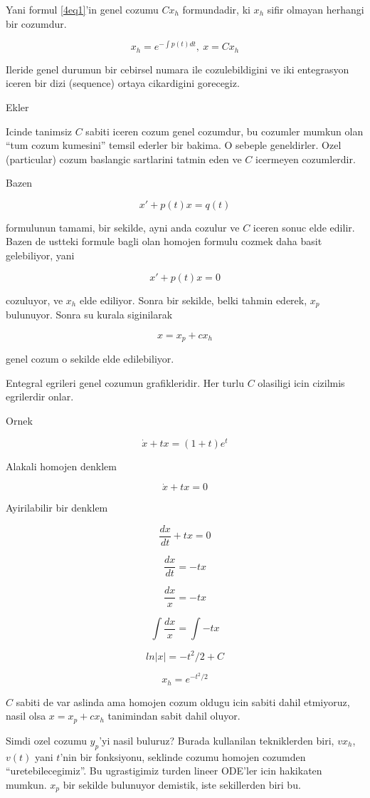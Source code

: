 \documentclass[12pt,fleqn]{article}
\begin{document}
Yani formul \ref{4eq1}'in genel cozumu $C x_h$ formundadir, ki $x_h$ sifir
olmayan herhangi bir cozumdur.

\[ x_h = e^{- \int p(t) dt} , \ x = C x_h \]

Ileride genel durumun bir cebirsel numara ile cozulebildigini ve iki
entegrasyon iceren bir dizi (sequence) ortaya cikardigini gorecegiz. 

Ekler

Icinde tanimsiz $C$ sabiti iceren cozum genel cozumdur, bu cozumler mumkun
olan ``tum cozum kumesini'' temsil ederler bir bakima. O sebeple
geneldirler. Ozel (particular) cozum baslangic sartlarini tatmin eden ve
$C$ icermeyen cozumlerdir. 

Bazen 

\[ x' + p(t)x = q(t) \]
 
formulunun tamami, bir sekilde, ayni anda cozulur ve $C$ iceren sonuc elde
edilir. Bazen de ustteki formule bagli olan homojen formulu cozmek daha
basit gelebiliyor, yani

\[ x' + p(t)x = 0 \]
 
cozuluyor, ve $x_h$ elde ediliyor. Sonra bir sekilde, belki tahmin ederek,
$x_p$ bulunuyor. Sonra su kurala siginilarak 

\[ x = x_p + cx_h \]

genel cozum o sekilde elde edilebiliyor. 

Entegral egrileri genel cozumun grafikleridir. Her turlu $C$ olasiligi icin
cizilmis egrilerdir onlar. 

Ornek

\[ \dot{x} + tx = (1+t)e^t \]

Alakali homojen denklem 

\[ \dot{x} + tx = 0\]

Ayirilabilir bir denklem

\[ \frac{dx}{dt} + tx = 0 \]

\[ \frac{dx}{dt} = - tx  \]

\[ \frac{dx}{x} = -tx \]

\[ \int \frac{dx}{x} = \int -tx \]

\[ ln |x| = -t^2 / 2 + C \]

\[ x_h = e^{-t^2/2} \]

$C$ sabiti de var aslinda ama homojen cozum oldugu icin sabiti dahil
etmiyoruz, nasil olsa $x = x_p + cx_h$ tanimindan sabit dahil oluyor.

Simdi ozel cozumu $y_p$'yi nasil buluruz? Burada kullanilan tekniklerden
biri, $vx_h$, $v(t)$ yani $t$'nin bir fonksiyonu, seklinde cozumu homojen
cozumden ``uretebilecegimiz''. Bu ugrastigimiz turden lineer ODE'ler icin
hakikaten mumkun. $x_p$ bir sekilde bulunuyor demistik, iste sekillerden
biri bu. 
\end{document}
